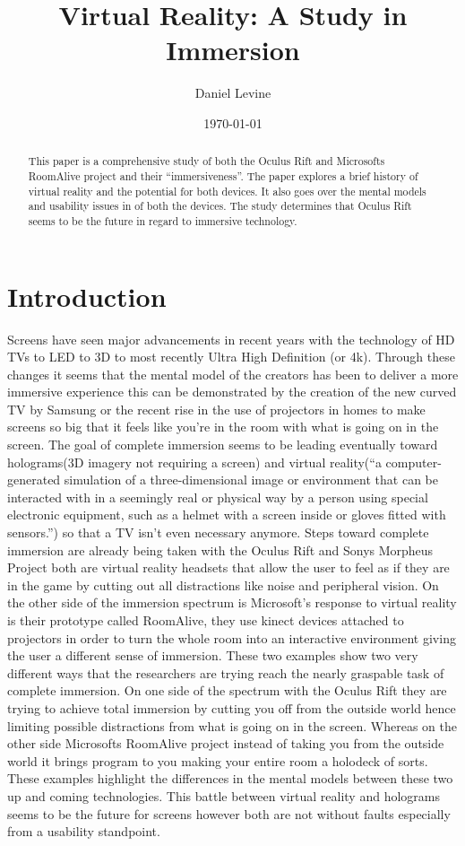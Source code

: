 \documentclass[a4paper]{article}
\title{Virtual Reality: A Study in Immersion}
\author{Daniel Levine}
\date{\today}
\begin{document}
\maketitle

\begin{abstract}
\indent \indent This paper is a comprehensive study of both the Oculus Rift and Microsofts RoomAlive project and their “immersiveness”. The paper explores a brief history of virtual reality and the potential for both devices. It also goes over the mental models and usability issues in of both the devices. The study determines that Oculus Rift seems to be the future in regard to immersive technology. 

\end{abstract}

\section{Introduction}

\indent \indent Screens have seen major advancements in recent years with the technology of HD TVs to LED to 3D to most recently Ultra High Definition (or 4k). Through these changes it seems that the mental model of the creators has been to deliver a more immersive experience this can be demonstrated by the creation of the new curved TV by Samsung or the recent rise in the use of projectors in homes to make screens so big that it feels like you're in the room with what is going on in the screen. The goal of complete immersion seems to be leading eventually toward holograms(3D imagery not requiring a screen) and virtual reality(“a computer-generated simulation of a three-dimensional image or environment that can be interacted with in a seemingly real or physical way by a person using special electronic equipment, such as a helmet with a screen inside or gloves fitted with sensors.”\cite{1}) so that a TV isn’t even necessary anymore. Steps toward complete immersion are already being taken with the Oculus Rift and Sonys Morpheus Project both are virtual reality headsets that allow the user to feel as if they are in the game by cutting out all distractions like noise and peripheral vision. On the other side of the immersion spectrum is Microsoft’s response to virtual reality is their prototype called RoomAlive, they use kinect devices attached to projectors in order to turn the whole room into an interactive environment giving the user a different sense of immersion. These two examples show two very different ways that the researchers are trying reach the nearly graspable task of complete immersion. On one side of the spectrum with the Oculus Rift they are trying to achieve total immersion by cutting you off from the outside world hence limiting possible distractions from what is going on in the screen. Whereas on the other side Microsofts RoomAlive project instead of taking you from the outside world it brings program to you making your entire room a holodeck of sorts. These examples highlight the differences in the mental models between these two up and coming technologies. This battle between virtual reality and holograms seems to be the future for screens however both are not without faults especially from a usability standpoint.
\end{document}
